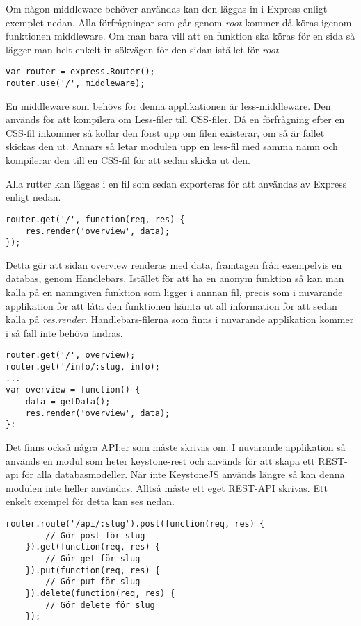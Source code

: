 Om någon middleware behöver användas kan den läggas in i Express enligt exemplet nedan. Alla förfrågningar som går genom \textit{root} kommer då köras igenom funktionen middleware. Om man bara vill att en funktion ska köras för en sida så lägger man helt enkelt in sökvägen för den sidan istället för \textit{root}. 
\begin{verbatim}
var router = express.Router();
router.use('/', middleware);
\end{verbatim}
En middleware som behövs för denna applikationen är less-middleware. Den används för att kompilera om Less-filer till CSS-filer. Då en förfrågning efter en CSS-fil inkommer så kollar den först upp om filen existerar, om så är fallet skickas den ut. Annars så letar modulen upp en less-fil med samma namn och kompilerar den till en CSS-fil för att sedan skicka ut den. 

Alla rutter kan läggas i en fil som sedan exporteras för att användas av Express enligt nedan. 
\begin{verbatim}
router.get('/', function(req, res) {
    res.render('overview', data);
});

\end{verbatim}
Detta gör att sidan overview renderas med data, framtagen från exempelvis en databas, genom Handlebars. Istället för att ha en anonym funktion så kan man kalla på en namngiven funktion som ligger i annnan fil, precis som i nuvarande applikation för att låta den funktionen hämta ut all information för att sedan kalla på \textit{res.render}. Handlebars-filerna som finns i nuvarande applikation kommer i så fall inte behöva ändras. 
\begin{verbatim}
router.get('/', overview);
router.get('/info/:slug, info);
...
var overview = function() {
    data = getData();
    res.render('overview', data);
}:
\end{verbatim} 

Det finns också några API:er som måste skrivas om. I nuvarande applikation så används en modul som heter keystone-rest och används för att skapa ett REST-api för alla databasmodeller. När inte KeystoneJS används längre så kan denna modulen inte heller användas. Alltså måste ett eget REST-API skrivas. Ett enkelt exempel för detta kan ses nedan. 

\begin{verbatim}
router.route('/api/:slug').post(function(req, res) {
        // Gör post för slug
    }).get(function(req, res) {
        // Gör get för slug
    }).put(function(req, res) {
        // Gör put för slug
    }).delete(function(req, res) {
        // Gör delete för slug
    });
\end{verbatim}

